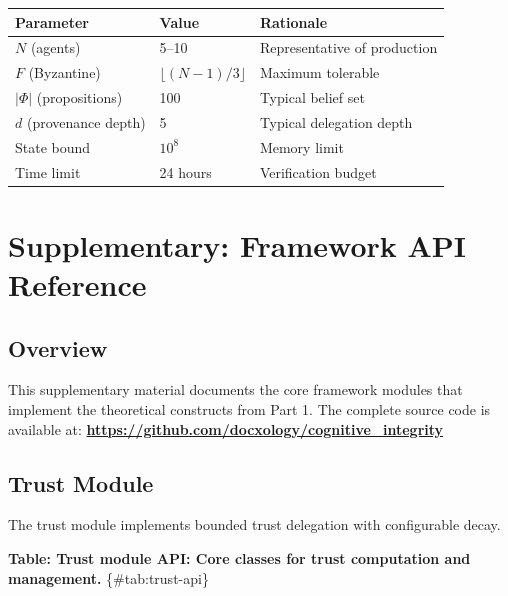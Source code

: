 \documentclass[
]{article}
\newcounter{none} %
\begin{document}
{\def\LTcaptype{none} %
\begin{longtable}[]{@{}lll@{}}
\toprule\noalign{}
Parameter & Value & Rationale \\
\midrule\noalign{}
\endhead
\bottomrule\noalign{}
\endlastfoot
\(N\) (agents) & 5--10 & Representative of production \\
\(F\) (Byzantine) & \(\lfloor (N-1)/3 \rfloor\) & Maximum tolerable \\
\(|\Phi|\) (propositions) & 100 & Typical belief set \\
\(d\) (provenance depth) & 5 & Typical delegation depth \\
State bound & \(10^8\) & Memory limit \\
Time limit & 24 hours & Verification budget \\
\end{longtable}
}

\newpage

\newpage

\section{Supplementary: Framework API
Reference}\label{sec:framework-api}

\subsection{Overview}\label{overview}

This supplementary material documents the core framework modules that
implement the theoretical constructs from Part 1. The complete source
code is available at:
\textbf{\url{https://github.com/docxology/cognitive_integrity}}

\subsection{Trust Module}\label{sec:trust-module-api}

The trust module implements bounded trust delegation with configurable
decay.

\textbf{Table: Trust module API: Core classes for trust computation and
management.} \{\#tab:trust-api\}
\end{document}
